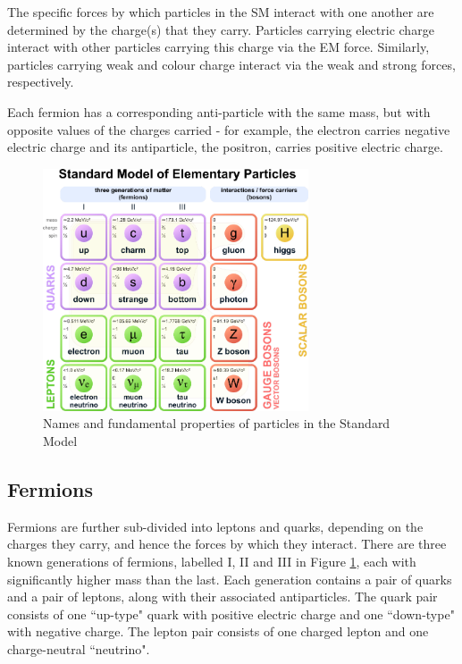 The specific forces by which particles in the SM interact with one another are determined by the charge(s) that they carry. Particles carrying electric charge interact with other particles carrying this charge via the EM force. Similarly, particles carrying weak and colour charge interact via the weak and strong forces, respectively. 

Each fermion has a corresponding anti-particle with the same mass, but with opposite values of the charges carried - for example, the electron carries negative electric charge and its antiparticle, the positron, carries positive electric charge. 

\begin{figure}[H]
	\centering
	\includegraphics[width=0.7\textwidth]{Figures/1/StandardModel.pdf}
	\caption[]{Names and fundamental properties of particles in the Standard Model}
	\label{fig:standard_model}
\end{figure}

\subsection{Fermions}

Fermions are further sub-divided into leptons and quarks, depending on the charges they carry, and hence the forces by which they interact. There are three known generations of fermions, labelled I, II and III in Figure \ref{fig:standard_model}, each with significantly higher mass than the last. Each generation contains a pair of quarks and a pair of leptons, along with their associated antiparticles. The quark pair consists of one ``up-type" quark with positive electric charge and one ``down-type" with negative charge. The lepton pair consists of one charged lepton and one charge-neutral ``neutrino". 

